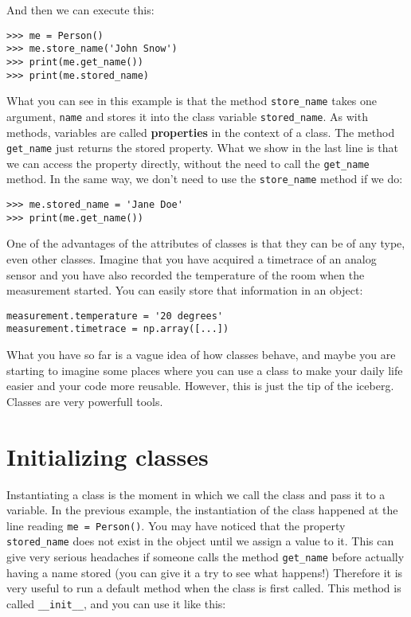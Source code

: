 And then we can execute this:

\begin{verbatim}
>>> me = Person()
>>> me.store_name('John Snow')
>>> print(me.get_name())
>>> print(me.stored_name)
\end{verbatim}

What you can see in this example is that the method \texttt{store_name}
takes one argument, \texttt{name} and stores it into the class variable
\texttt{stored_name}. As with methods, variables are called \textbf{properties}
in the context of a class. The method \texttt{get_name} just returns
the stored property. What we show in the last line is that we can access
the property directly, without the need to call the \texttt{get_name}
method. In the same way, we don't need to use the \texttt{store_name}
method if we do:

\begin{verbatim}
>>> me.stored_name = 'Jane Doe'
>>> print(me.get_name())
\end{verbatim}

One of the advantages of the attributes of classes is that they can be
of any type, even other classes. Imagine that you have acquired a timetrace
of an analog sensor and you have also recorded the temperature of the
room when the measurement started. You can easily store that information
in an object:

\begin{verbatim}
measurement.temperature = '20 degrees'
measurement.timetrace = np.array([...])
\end{verbatim}

What you have so far is a vague idea of how classes behave, and maybe
you are starting to imagine some places where you can use a class to
make your daily life easier and your code more reusable. However, this
is just the tip of the iceberg. Classes are very powerfull
tools.

\section{Initializing classes}\label{initializing-classes}
Instantiating a class is the moment in which we call the class and pass
it to a variable. In the previous example, the instantiation of the
class happened at the line reading \texttt{me = Person()}. You may
have noticed that the property \texttt{stored_name} does not exist in
the object until we assign a value to it. This can give very serious
headaches if someone calls the method \texttt{get_name} before actually
having a name stored (you can give it a try to see what happens!)
Therefore it is very useful to run a default method when the class is
first called. This method is called \texttt{__init__}, and you can
use it like this:

